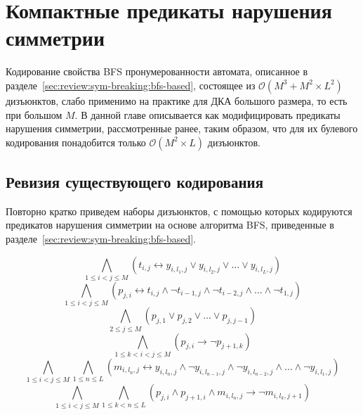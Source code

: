 
\chapter{Компактные предикаты нарушения симметрии} 
\label{sec:tight}

Кодирование свойства BFS пронумерованности автомата, описанное в разделе~\ref{sec:review:sym-breaking:bfs-based}, состоящее из $\mathcal{O}\left(M^{3} + M^{2} \times L^{2}\right)$ дизъюнктов, слабо применимо на практике для ДКА большого размера, то есть при большом $M$. 
В данной главе описывается как модифицировать предикаты нарушения симметрии, рассмотренные ранее, таким образом, что для их булевого кодирования понадобится только $\mathcal{O}\left(M^{2} \times L\right)$ дизъюнктов.



\section{Ревизия существующего кодирования}
\label{sec:tight:review}

Повторно кратко приведем наборы дизъюнктов, с помощью которых кодируются предикатов нарушения симметрии на основе алгоритма BFS, приведенные в разделе~\ref{sec:review:sym-breaking:bfs-based}.

\begin{equation}
\label{eq:t-def}
  \bigwedge_{1 \leq i < j \leq M} \left(t_{i,j} \leftrightarrow y_{i,l_{1},j} \vee y_{i,l_{2},j} \vee \ldots \vee y_{i,l_{L},j} \right)
\end{equation}
%
\begin{equation}
\label{eq:p-def}
  \bigwedge_{1 \leq i < j \leq M} \left(p_{j,i} \leftrightarrow t_{i,j} \wedge \neg t_{i - 1,j} \wedge \neg t_{i - 2, j} \wedge \ldots \wedge \neg t_{1,j}\right)
\end{equation}
%
\begin{equation}
\label{eq:p-alo}
  \bigwedge_{2 \leq j \leq M} \left(p_{j,1} \vee p_{j,2} \vee \ldots \vee p_{j,j - 1}\right)
\end{equation}
%
\begin{equation}
\label{eq:p-order}
  \bigwedge_{1 \leq k < i < j \leq M} \left(p_{j,i} \rightarrow \neg p_{j + 1, k}\right)
\end{equation}
%
\begin{equation}
\label{eq:m-def}
  \bigwedge_{1 \leq i < j \leq M} \bigwedge_{1 \leq n \leq L} \left(m_{i,l_{n},j} \leftrightarrow y_{i,l_{n},j} \wedge \neg y_{i,l_{n - 1}, j} \wedge \neg y_{i,l_{n - 2}, j} \wedge \ldots \wedge \neg y_{i,l_{1},j} \right)
\end{equation}
%
\begin{equation}
\label{eq:m-order}
  \bigwedge_{1 \leq i < j \leq M} \bigwedge_{1 \leq k < n \leq L} \left(p_{j,i} \wedge p_{j + 1, i} \wedge m_{i,l_{n}, j} \rightarrow \neg m_{i, l_{k}, j + 1}\right)
\end{equation}

